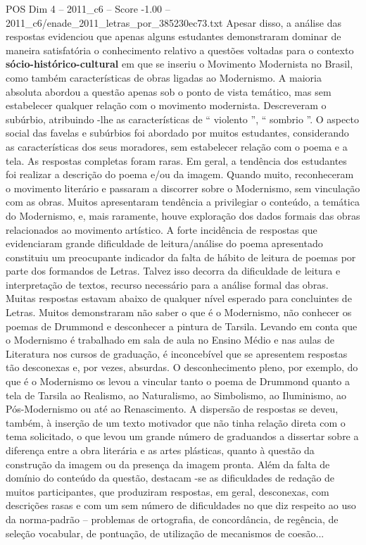 \begin{textsample}{POS Dim 4 – 2011\_c6 – Score -1.00 – 2011\_c6/enade\_2011\_letras\_por\_385230ec73.txt}
Apesar disso, a análise das respostas evidenciou que apenas alguns estudantes demonstraram dominar de maneira satisfatória o conhecimento relativo a questões voltadas para o contexto \textbf{sócio-histórico-cultural} em que se inseriu o Movimento Modernista no Brasil, como também características de obras ligadas ao Modernismo.
A maioria absoluta abordou a questão apenas sob o ponto de vista temático, mas sem estabelecer qualquer relação com o movimento modernista.
Descreveram o subúrbio, atribuindo -lhe as características de “ violento ”, “ sombrio ”.
O aspecto social das favelas e subúrbios foi abordado por muitos estudantes, considerando as características dos seus moradores, sem estabelecer relação com o poema e a tela.
As respostas completas foram raras.
Em geral, a tendência dos estudantes foi realizar a descrição do poema e/ou da imagem.
Quando muito, reconheceram o movimento literário e passaram a discorrer sobre o Modernismo, sem vinculação com as obras.
Muitos apresentaram tendência a privilegiar o conteúdo, a temática do Modernismo, e, mais raramente, houve exploração dos dados formais das obras relacionados ao movimento artístico.
A forte incidência de respostas que evidenciaram grande dificuldade de leitura/análise do poema apresentado constituiu um preocupante indicador da falta de hábito de leitura de poemas por parte dos formandos de Letras.
Talvez isso decorra da dificuldade de leitura e interpretação de textos, recurso necessário para a análise formal das obras.
Muitas respostas estavam abaixo de qualquer nível esperado para concluintes de Letras.
Muitos demonstraram não saber o que é o Modernismo, não conhecer os poemas de Drummond e desconhecer a pintura de Tarsila.
Levando em conta que o Modernismo é trabalhado em sala de aula no Ensino Médio e nas aulas de Literatura nos cursos de graduação, é inconcebível que se apresentem respostas tão desconexas e, por vezes, absurdas.
O desconhecimento pleno, por exemplo, do que é o Modernismo os levou a vincular tanto o poema de Drummond quanto a tela de Tarsila ao Realismo, ao Naturalismo, ao Simbolismo, ao Iluminismo, ao Pós-Modernismo ou até ao Renascimento.
A dispersão de respostas se deveu, também, à inserção de um texto motivador que não tinha relação direta com o tema solicitado, o que levou um grande número de graduandos a dissertar sobre a diferença entre a obra literária e as artes plásticas, quanto à questão da construção da imagem ou da presença da imagem pronta.
Além da falta de domínio do conteúdo da questão, destacam -se as dificuldades de redação de muitos participantes, que produziram respostas, em geral, desconexas, com descrições rasas e com um sem número de dificuldades no que diz respeito ao uso da norma-padrão – problemas de ortografia, de concordância, de regência, de seleção vocabular, de pontuação, de utilização de mecanismos de coesão...

\end{textsample}
